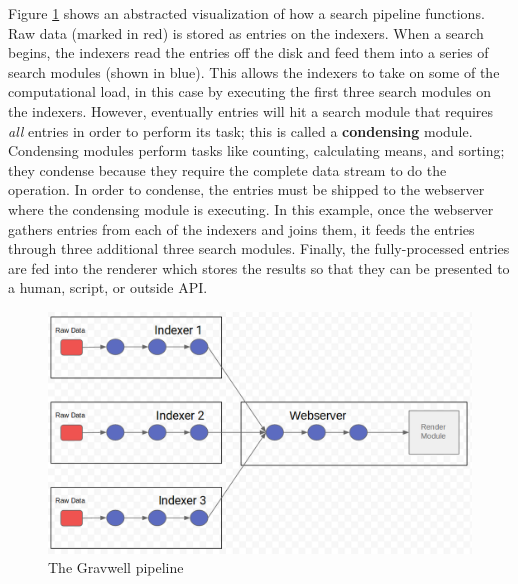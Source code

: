 Figure \ref{fig:pipeline} shows an abstracted visualization of how a search
pipeline functions. Raw data (marked in red) is stored as entries on the indexers. When a
search begins, the indexers read the entries off the disk and feed them
into a series of search modules (shown in blue). This allows the
indexers to take on some of the computational load, in this case by
executing the first three search modules on the indexers. However,
eventually entries will hit a search module that requires
\emph{all} entries in order to perform its task; this is called a
\textbf{condensing} module. Condensing modules perform tasks like counting,
calculating means, and sorting; they condense because they require the
complete data stream to do the operation. In order to condense, the
entries must be shipped to the webserver where the condensing module is
executing. In this example, once the webserver gathers entries from
each of the indexers and joins them, it feeds the entries through three
additional three search modules. Finally, the fully-processed entries
are fed into the renderer which stores the results so that they can be
presented to a human, script, or outside API.

\begin{figure}
	\includegraphics{images/pipeline.png}
	\caption{The Gravwell pipeline}
	\label{fig:pipeline}
\end{figure}




\clearpage
